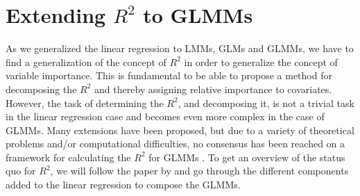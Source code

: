 








\section{Extending \texorpdfstring{$R^2$}{Lg} to GLMMs}
\label{sec:R2_GLMM}
As we generalized the linear regression to LMMs, GLMs and GLMMs, we have to find a generalization of the concept of $R^2$ in order to generalize the concept of variable importance. This is fundamental to be able to propose a method for decomposing the $R^2$ and thereby assigning relative importance to covariates.
However, the task of determining the $R^2$, and decomposing it, is not a trivial task in the linear regression case and becomes even more complex in the case of GLMMs.
Many extensions have been proposed, but due to a variety of theoretical problems and/or computational difficulties, no consensus has been reached on a framework for calculating the $R^2$ for GLMMs \citep{nakagawa2013general}.
To get an overview of the status quo for $R^2$, we will follow the paper by \citet{nakagawa2013general} and go through the different components added to the linear regression to compose the GLMMs.
